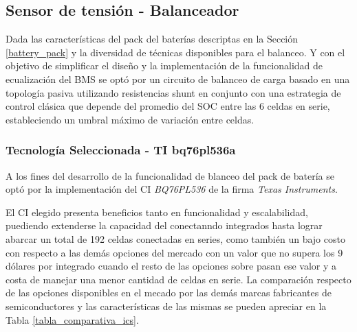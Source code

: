 \documentclass[10pt,a4paper]{article}
\begin{document}
\begin{itemize}
\subsection{Sensor de tensi\'on - Balanceador}

Dada las caracter\'isticas del pack del baterías descriptas en la Secci\'on
\ref{battery_pack} y la diversidad de t\'ecnicas disponibles para el balanceo. Y
con el objetivo de simplificar el diseño y la implementación de la funcionalidad
de ecualizaci\'on del \acrshort{BMS} se opt\'o por un circuito de balanceo de
carga basado en una topolog\'ia pasiva utilizando resistencias shunt en conjunto
con una estrategia de control cl\'asica que depende del promedio del
\acrshort{SOC} entre las 6 celdas en serie, estableciendo un umbral m\'aximo de
variaci\'on entre celdas. 

\subsubsection{Tecnolog\'ia Seleccionada - TI bq76pl536a}

A los fines del desarrollo de la funcionalidad de blanceo del pack de batería se
opt\'o por la implementación del \acrlong{CI} \emph{BQ76PL536} de la firma
\emph{Texas Instruments}.

El \acrshort{CI} elegido presenta beneficios tanto en funcionalidad y
escalabilidad, puediendo extenderse la capacidad del  conectanndo
integrados hasta lograr abarcar un total de 192 celdas conectadas en series,
como tambi\'en un bajo costo con respecto a las demás opciones del mercado con
un valor que no supera los 9 d\'olares por integrado cuando el resto de las
opciones sobre pasan ese valor y a costa de  manejar una menor cantidad de
celdas en serie. La comparación respecto de las opciones disponibles en el
mecado por las demás marcas fabricantes de semiconductores y las características
de las mismas se pueden apreciar en la Tabla \ref{tabla_comparativa_ics}. 


\end{itemize}
\end{document}
